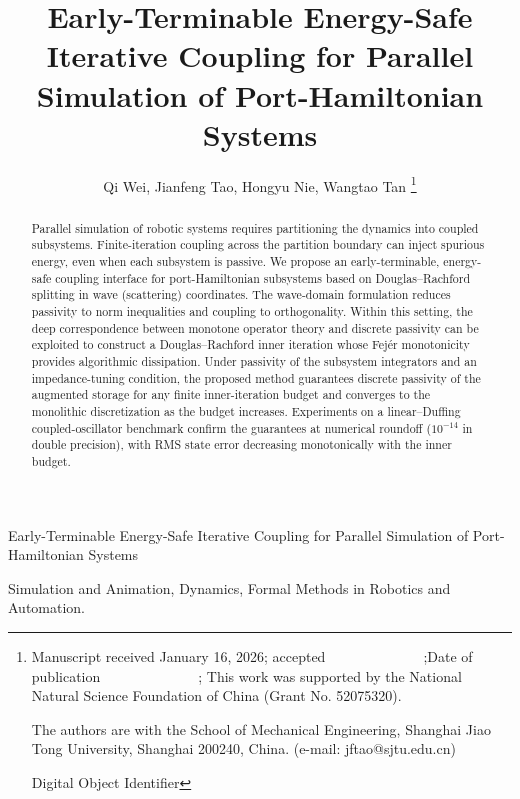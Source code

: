 \documentclass[lettersize,journal]{IEEEtran}
\theoremstyle{remark}
\begin{document}
\title{Early-Terminable Energy-Safe Iterative Coupling for Parallel Simulation of Port-Hamiltonian Systems}
\author{Qi Wei, Jianfeng Tao, Hongyu Nie, Wangtao Tan
\thanks{Manuscript received January 16, 2026; accepted ~~ ~~~~~~ ~~~~;Date of publication ~~ ~~~~~~ ~~~~; This work was supported by the National
Natural Science Foundation of China (Grant No. 52075320). 

The authors are with the School of Mechanical Engineering, Shanghai Jiao Tong University, Shanghai 200240, China. (e-mail: jftao@sjtu.edu.cn)

Digital Object Identifier
}}
 
%
{Early-Terminable Energy-Safe Iterative Coupling for Parallel Simulation of Port-Hamiltonian Systems}

\maketitle

\begin{abstract}
Parallel simulation of robotic systems requires partitioning the dynamics into coupled subsystems. Finite-iteration coupling across the partition boundary can inject spurious energy, even when each subsystem is passive. We propose an early-terminable, energy-safe coupling interface for port-Hamiltonian subsystems based on Douglas--Rachford splitting in wave (scattering) coordinates. The wave-domain formulation reduces passivity to norm inequalities and coupling to orthogonality. Within this setting, the deep correspondence between monotone operator theory and discrete passivity can be exploited to construct a Douglas--Rachford inner iteration whose Fejér monotonicity provides algorithmic dissipation. 
Under passivity of the subsystem integrators and an impedance-tuning condition, the proposed method guarantees discrete passivity of the augmented storage for any finite inner-iteration budget and converges to the monolithic discretization as the budget increases. Experiments on a linear--Duffing coupled-oscillator benchmark confirm the guarantees at numerical roundoff ($10^{-14}$ in double precision), with RMS state error decreasing monotonically with the inner budget.

\end{abstract}

\begin{IEEEkeywords}
Simulation and Animation, Dynamics, Formal Methods in Robotics and Automation.
\end{IEEEkeywords}















\vspace{-1.5\baselineskip}
\end{document}
